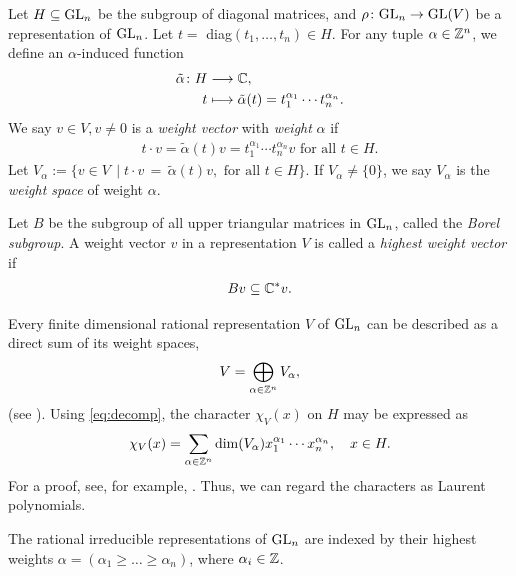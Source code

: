 \documentclass[11pt]{amsart}
\begin{document}
\begin{defin}\label{def:weight}
    Let $H\subseteq \mathrm{GL}_n$ be the subgroup of diagonal matrices, and $\rho \colon \mathrm{GL}_n \rightarrow \mathrm{GL}(V)$ be a representation of $\mathrm{GL}_n$. Let $t =$ diag$(t_1,\dots,t_n) \in H$.
    For any tuple $\alpha \in \mathbb{Z}^n$, we define an $\alpha$-induced function
    \begin{align*}
        \tilde\alpha \colon H &\longrightarrow \mathbb{C},\\
        t &\longmapsto \tilde\alpha(t) = t_1^{\alpha_1}\cdots t_n^{\alpha_n}.
    \end{align*}
We say $v \in V, v \neq 0$ is a \emph{weight vector} with \emph{weight} $\alpha$ if
\begin{align}
    t\cdot v = \tilde\alpha (t) v = t_1^{\alpha_1}\cdots t_n^{\alpha_n} v \text{ for all } t \in H.
\end{align}
Let $V_\alpha := \{v \in V\,  \mid t \cdot v \, = \, \tilde\alpha(t) v, \text{ for all } t\in H \}$. If $V_\alpha \neq \{0\}$,  we say $V_\alpha$ is the \emph{weight space} of weight $\alpha$. 

Let $B$ be the subgroup of all upper triangular matrices in $\mathrm{GL}_n$, called the \emph{Borel subgroup}. A weight vector $v$ in a representation $V$ is called a \emph{highest weight vector} if
\begin{align*}
    B  v \subseteq \mathbb{C}^* v.
\end{align*}
\end{defin}
\begin{rem}\label{rk:starfruit}
    Every finite dimensional rational representation $V$ of $\mathrm{GL}_n$ can be described as a direct sum of its weight spaces,
\begin{align}
    V = \bigoplus_{\alpha \in \mathbb{Z}^n} V_\alpha, \label{eq:decomp}
\end{align}
(see \cite[\S 8.2, p.~116]{Ful97}).
Using \cref{eq:decomp}, the character $\chi_V (x)$ on $H$ may be expressed as
\begin{align}
    \chi_{V}(x) = \sum_{\alpha \in \mathbb{Z}^n}\dim(V_\alpha) x_1^{\alpha_1}\cdots x_n^{\alpha_n}, \quad x \in H. \label{eq:char}
\end{align}
For a proof, see, for example, \cite[\S 8.2, p.120]{Ful97}. Thus, we can regard the characters as Laurent polynomials. 
\end{rem}

\begin{prop}
The rational irreducible representations of $\mathrm{GL}_n$ are indexed by their highest weights $  \alpha = (\alpha_1 \geq \dots \geq \alpha_n)$, where $\alpha_i \in \mathbb{Z}$. %
\end{prop}
\end{document}
